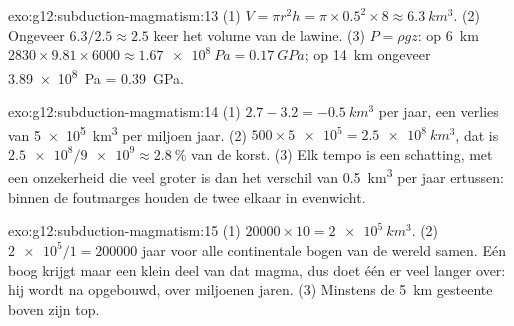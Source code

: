 \begin{solution}{exo:g12:subduction-magmatism:13}
(1) $V = \pi r^2 h = \pi \times 0.5^2 \times 8 \approx \qty{6.3}{km^3}$.
(2) Ongeveer $6.3/2.5 \approx 2.5$ keer het volume van de lawine.
(3) $P = \rho g z$: op \qty{6}{km} $2830 \times 9.81 \times 6000 \approx
\qty{1.67e8}{Pa} = \qty{0.17}{GPa}$; op \qty{14}{km} ongeveer
\qty{3.89e8}{Pa} = \qty{0.39}{GPa}.
\end{solution}

\begin{solution}{exo:g12:subduction-magmatism:14}
(1) $2.7 - 3.2 = \qty{-0.5}{km^3}$ per jaar, een verlies van \qty{5e5}{km^3} per
miljoen jaar. (2) $500 \times \num{5e5} = \qty{2.5e8}{km^3}$, dat is
$\num{2.5e8}/\num{9e9} \approx \qty{2.8}{\percent}$ van de korst. (3) Elk
tempo is een schatting, met een onzekerheid die veel groter is dan het verschil van
\qty{0.5}{km^3} per jaar ertussen: binnen de foutmarges houden de twee elkaar in evenwicht.
\end{solution}

\begin{solution}{exo:g12:subduction-magmatism:15}
(1) $\num{20000} \times 10 = \qty{2e5}{km^3}$. (2) $\num{2e5}/1 =
\num{200000}$ jaar voor alle continentale bogen van de wereld samen. Eén
boog krijgt maar een klein deel van dat magma, dus doet één  er
veel langer over: hij wordt  na  opgebouwd, over miljoenen jaren. (3) Minstens
de \qty{5}{km} gesteente boven zijn top.
\end{solution}

